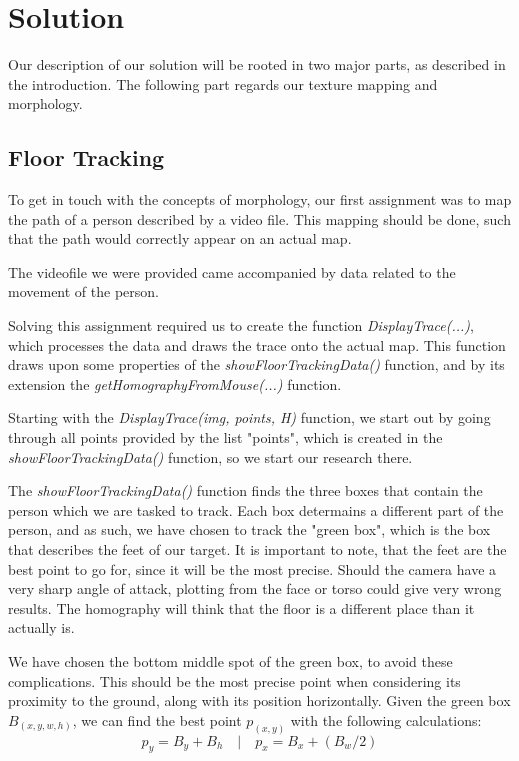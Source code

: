 \section{Solution}
Our description of our solution will be rooted in two major parts, as described in the introduction.
The following part regards our texture mapping and morphology.\newline

\subsection{Floor Tracking}
To get in touch with the concepts of morphology, our first assignment was to map the path of a person described by a video file. This mapping should be done, such that the path would correctly appear on an actual map.\newline

The videofile we were provided came accompanied by data related to the movement of the person.\newline

Solving this assignment required us to create the function \textsl{DisplayTrace(...)}, which processes the data and draws the trace onto the actual map. This function draws upon some properties of the \textsl{showFloorTrackingData()} function, and by its extension the \textsl{getHomographyFromMouse(...)} function.\newline

Starting with the \textsl{DisplayTrace(img, points, H)} function, we start out by going through all points provided by the list "points", which is created in the \textsl{showFloorTrackingData()} function, so we start our research there.\newline

The \textsl{showFloorTrackingData()} function finds the three boxes that contain the person which we are tasked to track. Each box determains a different part of the person, and as such, we have chosen to track the "green box", which is the box that describes the feet of our target. It is important to note, that the feet are the best point to go for, since it will be the most precise. Should the camera have a very sharp angle of attack, plotting from the face or torso could give very wrong results. The homography will think that the floor is a different place than it actually is.\newline

We have chosen the bottom middle spot of the green box, to avoid these complications. This should be the most precise point when considering its proximity to the ground, along with its position horizontally. Given the green box \(B_(x,y,w,h)\), we can find the best point \(p_(x,y)\) with the following calculations:
\[p_y = B_y+B_h \quad | \quad p_x = B_x + (B_w / 2)\]

